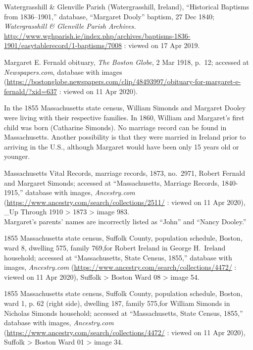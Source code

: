 \begin{thebibliography}{999}
	\raggedright
	\small
	


Watergrasshill \& Glenville Parish (Watergrasshill, Ireland), ``Historical Baptisms from 1836--1901,'' database, ``Margaret Dooly'' baptism, 27 Dec 1840; \textit{Watergrasshill \& Glenville Parish Archives.} \url{http://www.wghparish.ie/index.php/archives/baptisms-1836-1901/easytablerecord/1-baptisms/7008} : viewed on 17 Apr 2019.

Margaret E. Fernald obituary, \textit{The Boston Globe}, 2 Mar 1918, p.\ 12; accessed at \textit{Newspapers.com}, database with images (\url{https://bostonglobe.newspapers.com/clip/48493997/obituary-for-margaret-e-fernald/?xid=637} : viewed on 11 Apr 2020).

In the 1855 Massachusetts state census, William Simonds and Margaret Dooley were living with their respective families. In 1860, William and Margaret's first child was born (Catharine Simonds). No marriage record can be found in Massachusetts. Another possibility is that they were married in Ireland prior to arriving in the U.S., although Margaret would have been only 15 years old or younger.

Massachusetts Vital Records, marriage records, 1873, no.\ 2971, Robert Fernald and Margaret Simonds; accessed at ``Massachusetts, Marriage Records, 1840-1915,'' database with images, \textit{Ancestry.com} (\url{https://www.ancestry.com/search/collections/2511/} : viewed on 11 Apr 2020), \_Up Through 1910 > 1873 > image 983.\\
Margaret's parents' names are incorrectly listed as ``John'' and ``Nancy Dooley.''

1855 Massachusetts state census, Suffolk County, population schedule, Boston, ward 8, dwelling 575, family 769,for Robert Ireland in George H.\ Ireland household; accessed at ``Massachusetts, State Census, 1855,'' database with images, \textit{Ancestry.com} (\url{https://www.ancestry.com/search/collections/4472/} : viewed on 11 Apr 2020), Suffolk > Boston Ward 08 > image 54.

1855 Massachusetts state census, Suffolk County, population schedule, Boston, ward 1, p. 62 (right side), dwelling 187, family 575,for William Simonds in Nicholas Simonds household; accessed at ``Massachusetts, State Census, 1855,'' database with images, \textit{Ancestry.com} (\url{https://www.ancestry.com/search/collections/4472/} : viewed on 11 Apr 2020), Suffolk > Boston Ward 01 > image 34.


\end{thebibliography}
